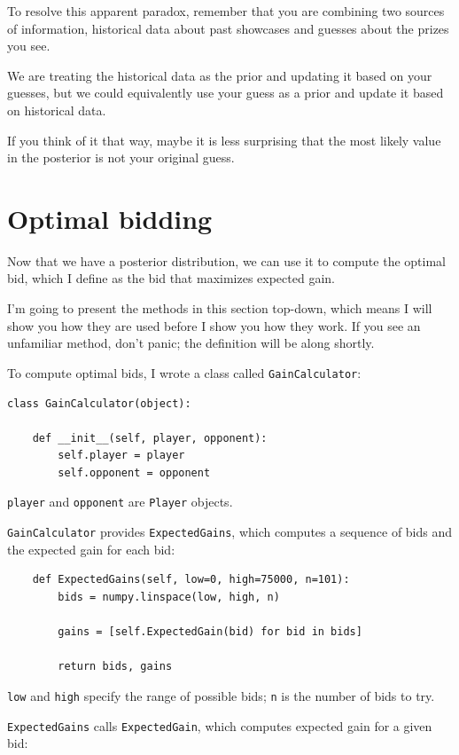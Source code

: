\documentclass[12pt]{book}
\begin{document}
To resolve this apparent paradox, remember that you are combining two
sources of information, historical data about past showcases and
guesses about the prizes you see.

We are treating the historical data as the prior and updating it
based on your guesses, but we could equivalently use your guess
as a prior and update it based on historical data.  

If you think of it that way, maybe it is less surprising that the
most likely value in the posterior is not your original guess.


\section{Optimal bidding}

Now that we have a posterior distribution, we can use it to
compute the optimal bid, which I define as the bid that maximizes
expected gain.

I'm going to present the methods in this section top-down, which
means I will show you how they are used before I show you how they
work.  If you see an unfamiliar method, don't panic; the definition
will be along shortly.

To compute optimal bids, I wrote a class called {\tt GainCalculator}:

\begin{verbatim}
class GainCalculator(object):

    def __init__(self, player, opponent):
        self.player = player
        self.opponent = opponent
\end{verbatim}

{\tt player} and {\tt opponent} are {\tt Player} objects.

{\tt GainCalculator} provides {\tt ExpectedGains}, which
computes a sequence of bids and the expected gain for each
bid:

\begin{verbatim}
    def ExpectedGains(self, low=0, high=75000, n=101):
        bids = numpy.linspace(low, high, n)

        gains = [self.ExpectedGain(bid) for bid in bids]

        return bids, gains
\end{verbatim}

{\tt low} and {\tt high} specify the range of possible bids;
{\tt n} is the number of bids to try.  

{\tt ExpectedGains} calls {\tt ExpectedGain}, which
computes expected gain for a given bid:
\end{document}

